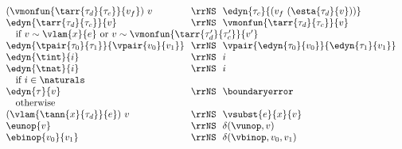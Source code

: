 \begin{flushleft}
\begin{minipage}[t]{\columnwidth}
\\
$\begin{array}{l@{~~}c@{~~}l}
  (\vmonfun{\tarr{\tau_d}{\tau_c}}{v_f})~v & \rrNS & \edyn{\tau_c}{(v_f~(\esta{\tau_d}{v}))}
\\
  \edyn{\tarr{\tau_d}{\tau_c}}{v} & \rrNS & \vmonfun{\tarr{\tau_d}{\tau_c}}{v}
\\ \multicolumn{3}{l}{\mbox{\quad if $v \sim \vlam{x}{e}$ or $v \sim \vmonfun{\tarr{\tau_d'}{\tau_c'}}{v'}$}}
\\
  \edyn{\tpair{\tau_0}{\tau_1}}{\vpair{v_0}{v_1}} & \rrNS & \vpair{\edyn{\tau_0}{v_0}}{\edyn{\tau_1}{v_1}}
\\
  \edyn{\tint}{i} & \rrNS & i
\\
  \edyn{\tnat}{i} & \rrNS & i
\\ \multicolumn{3}{l}{\mbox{\quad if $i \in \naturals$}}
\\
  \edyn{\tau}{v} & \rrNS & \boundaryerror
\\ \multicolumn{3}{l}{\mbox{\quad otherwise}}
\\
  (\vlam{\tann{x}{\tau_d}}{e})~v & \rrNS & \vsubst{e}{x}{v}
\\
  \eunop{v} & \rrNS & \delta(\vunop, v)
\\
  \ebinop{v_0}{v_1} & \rrNS & \delta(\vbinop, v_0, v_1)
\end{array}$
\end{minipage}

\end{flushleft}
